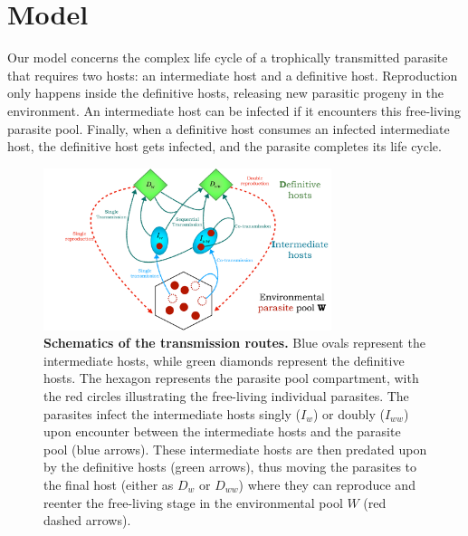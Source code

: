 \documentclass[a4paper]{scrartcl}
\begin{document}
\section*{Model}

Our model concerns the complex life cycle of a trophically transmitted parasite that requires two hosts: an intermediate host and a definitive host. 
Reproduction only happens inside the definitive hosts, releasing new parasitic progeny in the environment. 
An intermediate host can be infected if it encounters this free-living parasite pool. 
Finally, when a definitive host consumes an infected intermediate host, the definitive host gets infected, and the parasite completes its life cycle.

\begin{figure}[ht!]
\captionsetup{format=plain}
\centering
\includegraphics[width=0.75\textwidth]{schematics.pdf}
\caption{\textbf{Schematics of the transmission routes.} 
Blue ovals represent the intermediate hosts, while green diamonds represent the definitive hosts.
The hexagon represents the parasite pool compartment, with the red circles illustrating the free-living individual parasites.
The parasites infect the intermediate hosts singly ($I_w$) or doubly ($I_{ww}$) upon encounter between the intermediate hosts and the parasite pool (blue arrows).
These intermediate hosts are then predated upon by the definitive hosts (green arrows), thus moving the parasites to the final host (either as $D_w$ or $D_{ww}$) where they can reproduce and reenter the free-living stage in the environmental pool $W$ (red dashed arrows).
}
\label{fig:schematic}
\end{figure}
\end{document}
